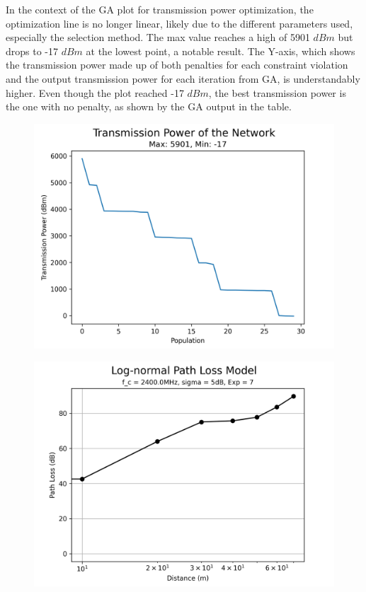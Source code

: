 In the context of the \gls{GA} plot for transmission power optimization, the optimization line is no longer linear, likely due to the different parameters used, especially the selection method. The max value reaches a high of 5901 $dBm$ but drops to -17 $dBm$ at the lowest point, a notable result. The Y-axis, which shows the transmission power made up of both penalties for each constraint violation and the output transmission power for each iteration from \gls{GA}, is understandably higher. Even though the plot reached -17 $dBm$, the best transmission power is the one with no penalty, as shown by the \gls{GA} output in the table.

\begin{figure}[H]
  \centering
  \begin{minipage}[t]{0.5\textwidth}
      \centering
      \includegraphics[width=1\linewidth]{images/research_results/genetic_algorithm_different_parameter_power.png}
      \label{fig:genetic_algorithm_different_parameter_power}
  \end{minipage}\hfill
  \begin{minipage}[t]{0.5\textwidth}
      \centering
      \includegraphics[width=1\linewidth]{images/research_results/path-loss-different-parameter.png}

\end{minipage}
\end{figure}
